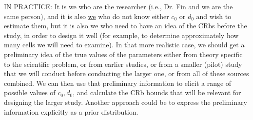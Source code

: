 \documentclass[letterpaper, 12pt]{article}\usepackage[]{graphicx}\usepackage[]{color}
\begin{document}
IN PRACTICE: It is \underline{we} who are the researcher (i.e., Dr. Fin and we are the same person), and it is also \underline{we}
who do not know either $c_0$ or $d_0$ and wish to estimate them, but it is also \underline{we} who need to have an idea of the
CRbs before the study, in order to design it well (for example, to determine approximately how many cells
we will need to examine). In that more realistic case, we should get a preliminary idea of the true values of
the parameters either from theory specific to the scientific problem, or from earlier studies, or from a smaller
(pilot) study that we will conduct before conducting the larger one, or from all of these sources combined.
We can then use that preliminary information to elicit a range of possible values of $c_0, d_0$, and calculate the
CRb bounds that will be relevant for designing the larger study. Another approach could be to express the
preliminary information explicitly as a prior distribution.
\end{document}
